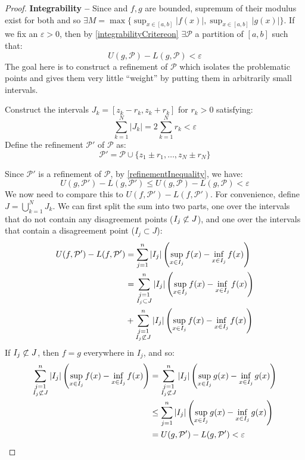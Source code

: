 \documentclass[../main.tex]{subfiles}
\begin{document}
\begin{proof}\par
  \textbf{Integrability --} Since and $f, g$ are bounded, supremum of their modulus exist for both and so $\exists M = \max\{\sup_{x \in [a, b]} |f(x)|, \sup_{x \in [a, b]} |g(x)|\}$.
  If we fix an $\varepsilon > 0$, then by \cref{integrabilityCritereon} $\exists \mathcal{P}$ a partition of $[a, b]$ such that:
  \[
    U(g, \mathcal{P}) - L(g, \mathcal{P}) < \varepsilon
  \]
  The goal here is to construct a refinement of $\mathcal{P}$ which isolates the problematic points and gives them very little ``weight'' by putting them in arbitrarily small intervals.

  Construct the intervals $J_{k} = [z_k - r_k, z_k + r_k]$ for $r_k > 0$ satisfying:
  \[
    \sum_{k = 1}^{N} |J_k| = 2 \sum_{k = 1}^{N} r_k < \varepsilon
  \]
  Define the refinement $\mathcal{P}'$ of $\mathcal{P}$ as:
  \[
    \mathcal{P}' = \mathcal{P} \cup \{z_1 \pm r_1, \ldots, z_N \pm r_N\}
  \]

  Since $\mathcal{P}'$ is a refinement of $\mathcal{P}$, by \cref{refinementInequality}, we have:
  \[
    U(g, \mathcal{P}') - L(g, \mathcal{P}') \leq U(g, \mathcal{P}) - L(g, \mathcal{P}) < \varepsilon
  \]
  We now need to compare this to $U(f, \mathcal{P}') - L(f, \mathcal{P}')$.
  For convenience, define $J = \bigcup_{k = 1}^{N} J_k$.
  We can first split the sum into two parts, one over the intervals that do not contain any disagreement points ($I_j \centernot\subset J$), and one over the intervals that contain a disagreement point ($I_j \subset J$):
  \begin{align*}
    U(f, \mathcal{P}') - L(f, \mathcal{P}') &= \sum_{j = 1}^{n} |I_j| \left(\sup_{x \in I_j} f(x) - \inf_{x \in I_j} f(x)\right) \\
                                            &= \sum_{\substack{j = 1\\I_j \subset J}}^{n} |I_j| \left(\sup_{x \in I_j} f(x) - \inf_{x \in I_j} f(x)\right) \\&+ \sum_{\substack{j = 1\\I_j \centernot\subset J}}^{n} |I_j| \left(\sup_{x \in I_j} f(x) - \inf_{x \in I_j} f(x)\right)
  \end{align*}
  If $I_j \centernot\subset J$, then $f = g$ everywhere in $I_j$, and so:
  \begin{align*}
    \sum_{\substack{j = 1\\I_j \centernot\subset J}}^{n} |I_j| \left(\sup_{x \in I_j} f(x) - \inf_{x \in I_j} f(x)\right) &= \sum_{\substack{j = 1\\I_j \centernot\subset J}}^{n} |I_j| \left(\sup_{x \in I_j} g(x) - \inf_{x \in I_j} g(x)\right) \\
                                                                                                                          &\leq \sum_{j = 1}^{n} |I_j| \left(\sup_{x \in I_j} g(x) - \inf_{x \in I_j} g(x)\right) \\
                                                                                                                          &= U(g, \mathcal{P}') - L(g, \mathcal{P}') < \varepsilon
  \end{align*}


\end{proof}
\end{document}
